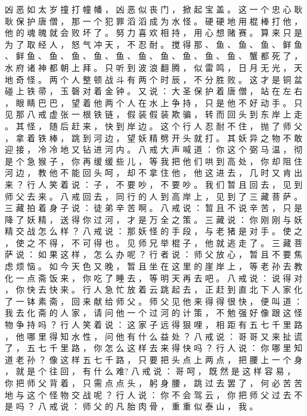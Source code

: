 {凶 恶 如 太 岁 撞 打 幢 幡 ， 凶 恶 似 丧 门 ， 掀 起 宝 盖 。
这 一 个 忠 心 耿 耿 保 护 唐 僧 ， 那 一 个 犯 罪 滔 滔 成 为 水 怪 。
硬 硬 地 用 棍 棒 打 他 ， 他 的 魂 魄 就 会 败 坏 了 。
努 力 喜 欢 相 持 ， 用 心 想 赌 赛 。
算 来 只 是 为 了 取 经 人 ， 怒 气 冲 天 ， 不 忍 耐 。
搅 得 那 、 鱼 、 鱼 、 鱼 、 鲜 鱼 、 鲜 鱼 、 鱼 、 鱼 、 鱼 、 鱼 、 鱼 、 鱼 、 鱼 、 鱼 、 鱼 、 蟹 都 死 了 ， 水 府 诸 神 都 朝 上 拜 。
只 听 到 波 浪 翻 腾 ， 似 雷 鸣 ， 日 月 无 光 ， 天 地 奇 怪 。
两 个 人 整 顿 战 斗 有 两 个 时 辰 ， 不 分 胜 败 。
这 才 是 铜 盆 碰 上 铁 帚 ， 玉 磬 对 着 金 钟 。
又 说 ： 大 圣 保 护 着 唐 僧 ， 站 在 左 右 ， 眼 睛 巴 巴 ， 望 着 他 两 个 人 在 水 上 争 持 ， 只 是 他 不 好 动 手 。
只 见 那 八 戒 虚 张 一 根 铁 链 ， 假 装 假 装 欺 骗 ， 转 而 回 头 到 东 岸 上 走 。
其 怪 ， 随 后 赶 来 ， 快 到 岸 边 。
这 个 行 人 忍 耐 不 住 ， 抛 了 师 父 ， 拿 着 铁 棒 ， 跳 到 河 边 ， 望 妖 精 劈 开 头 就 打 。
其 妖 异 之 物 不 敢 迎 接 ， 冷 冷 地 又 钻 进 河 内 。
八 戒 大 声 喊 道 ： 你 这 个 弼 马 温 ， 彻 是 个 急 猴 子 ， 你 再 缓 缓 些 儿 ， 等 我 把 他 们 哄 到 高 处 ， 你 却 阻 住 河 边 ， 教 他 不 能 回 头 呵 ， 却 不 拿 住 他 ， 他 这 进 去 ， 几 时 又 肯 出 来 ？ 行 人 笑 着 说 ： 子 ， 不 要 吵 ， 不 要 吵 。
我 们 暂 且 回 去 ， 见 到 师 父 去 来 。
八 戒 回 去 ， 同 行 的 人 到 高 岸 上 ， 见 到 了 三 藏 菩 萨 。
三 藏 拍 着 身 子 说 ： 徒 弟 辛 苦 啊 。
八 戒 说 ： 暂 且 不 说 辛 苦 ， 只 是 降 了 妖 精 ， 送 得 你 过 河 ， 才 是 万 全 之 策 。
三 藏 说 ： 你 刚 刚 与 妖 精 交 战 怎 么 样 ？ 八 戒 说 ： 那 妖 怪 的 手 段 ， 与 老 猪 是 对 手 。
使 之 ， 使 之 不 得 ， 不 可 得 也 。
见 师 兄 举 棍 子 ， 他 就 逃 走 了 。
三 藏 菩 萨 说 ： 如 果 这 样 ， 怎 么 办 呢 ？ 行 者 说 ： 师 父 放 心 ， 暂 且 不 要 焦 虑 烦 恼 。
如 今 天 色 又 晚 ， 暂 且 坐 在 这 里 的 崖 岸 上 ， 等 老 孙 去 教 化 一 点 斋 饭 来 ， 你 吃 了 睡 去 ， 等 明 天 再 去 吧 。
八 戒 说 ： 说 得 对 ， 你 快 去 快 来 。
行 人 急 忙 放 着 云 跳 起 去 ， 正 赶 到 直 北 下 人 家 化 了 一 钵 素 斋 ， 回 来 献 给 师 父 。
师 父 见 他 来 得 得 很 快 ， 便 叫 道 ： 我 去 化 斋 的 人 家 ， 请 问 他 一 个 过 河 的 计 策 ， 不 勉 强 好 像 跟 这 怪 物 争 持 吗 ？ 行 人 笑 着 说 ： 这 家 子 远 得 狠 哩 ， 相 距 有 五 七 千 里 路 ， 他 哪 里 得 知 水 性 ， 问 他 有 什 么 益 处 ？ 八 戒 说 ： 哥 哥 又 来 扯 谎 了 ， 五 七 千 里 路 ， 你 怎 么 这 样 去 来 得 快 吗 ？ 行 人 说 ： 你 哪 里 知 道 老 孙 ？
像 这 样 五 七 千 路 ， 只 要 把 头 点 上 两 点 ， 把 腰 上 一 个 身 ， 就 是 个 往 回 ， 有 什 么 难? 八 戒 说 ： 哥 呵 ， 既 然 是 这 样 容 易 ， 你 把 师 父 背 着 ， 只 需 点 点 头 ， 躬 身 腰 ， 跳 过 去 罢 了 ， 何 必 苦 苦 地 与 这 个 怪 物 交 战 呢 ？ 行 人 说 ： 你 不 会 驾 云 ， 你 把 师 父 过 去 不 是 吗 ？ 八 戒 说 ： 师 父 的 凡 胎 肉 骨 ， 重 重 似 泰 山 ， 我 。
}
